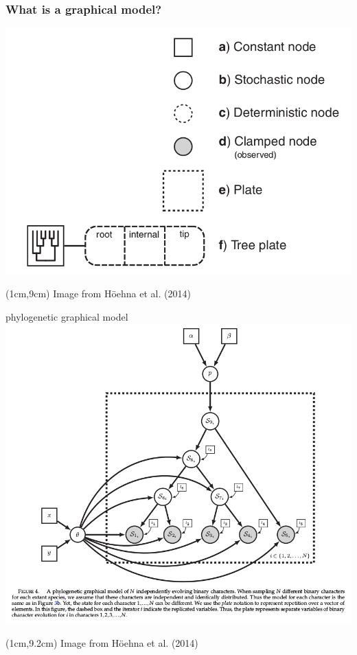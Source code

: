 \documentclass[mathserif]{beamer}
\begin{document}
\begin{frame}

    \frametitle{What is a graphical model?}
    \small
    \begin{center}
    \includegraphics[scale=0.3]{figures/graphical_model_legend.png}\\
    \end{center}
    \begin{textblock*}{10cm}(1cm,9cm)
    \tiny Image from H\"oehna et al. (2014)
    \end{textblock*}
\end{frame}

\begin{frame}

    \small
    \begin{center}
    \alert{phylogenetic graphical model}
    \includegraphics[scale=0.3]{figures/phylo_graphical.png}\\
    \end{center}
    \begin{textblock*}{10cm}(1cm,9.2cm)
    \tiny Image from H\"oehna et al. (2014)
    \end{textblock*}
\end{frame}
\end{document}
